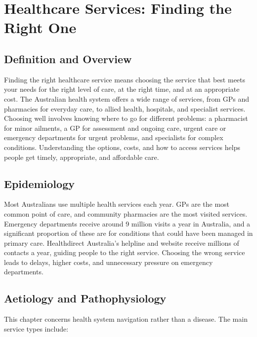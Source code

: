 \chapter{Healthcare Services: Finding the Right One}

\section*{Definition and Overview}
Finding the right healthcare service means choosing the service that best meets your needs for the right level of care, at the right time, and at an appropriate cost. The Australian health system offers a wide range of services, from GPs and pharmacies for everyday care, to allied health, hospitals, and specialist services. Choosing well involves knowing where to go for different problems: a pharmacist for minor ailments, a GP for assessment and ongoing care, urgent care or emergency departments for urgent problems, and specialists for complex conditions. Understanding the options, costs, and how to access services helps people get timely, appropriate, and affordable care.

\section*{Epidemiology}
Most Australians use multiple health services each year. GPs are the most common point of care, and community pharmacies are the most visited services. Emergency departments receive around 9 million visits a year in Australia, and a significant proportion of these are for conditions that could have been managed in primary care. Healthdirect Australia's helpline and website receive millions of contacts a year, guiding people to the right service. Choosing the wrong service leads to delays, higher costs, and unnecessary pressure on emergency departments.

\section*{Aetiology and Pathophysiology}
This chapter concerns health system navigation rather than a disease. The main service types include:

